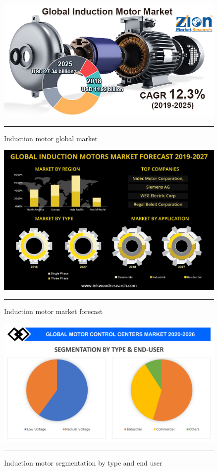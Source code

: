 \begin{figure}[htbp]
  \centering
    \includegraphics[width = 5in]{./Figures/MS/fig20.png}
    \rule{35em}{1.2pt}
  \caption{Induction motor global market}
  \label{fig:Induction motor global market}
\end{figure}
\begin{figure}[htbp]
  \centering
    \includegraphics[width = 5in]{./Figures/MS/fig19.jpg}
    \rule{35em}{1.2pt}
  \caption{Induction motor market forecast}
  \label{fig:Induction motor market forecast}
\end{figure}
\begin{figure}[htbp]
  \centering
    \includegraphics[width = 5in]{./Figures/MS/fig18.png}
    \rule{35em}{1.2pt}
  \caption{Induction motor segmentation by type and end user}
  \label{fig:Induction motor segmentation by type and end user}
\end{figure}

